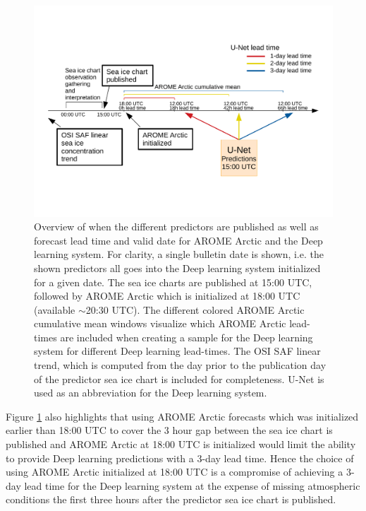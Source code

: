 \documentclass[../main/thesis]{subfiles}
\begin{document}
\begin{figure}
    \centering
    \includegraphics[width=\textwidth]{Predictor_schedule.pdf}
    \caption{\label{fig:pred_schedule}Overview of when the different predictors are published as well as forecast lead time and valid date for AROME Arctic and the Deep learning system. For clarity, a single bulletin date is shown, i.e. the shown predictors all goes into the Deep learning system initialized for a given date. The sea ice charts are published at 15:00 UTC, followed by AROME Arctic which is initialized at 18:00 UTC (available $\sim$20:30 UTC). The different colored AROME Arctic cumulative mean windows visualize which AROME Arctic lead-times are included when creating a sample for the Deep learning system for different Deep learning lead-times. The OSI SAF linear trend, which is computed from the day prior to the publication day of the predictor sea ice chart is included for completeness. U-Net is used as an abbreviation for the Deep learning system.}
\end{figure}

Figure \ref{fig:pred_schedule} also highlights that using AROME Arctic forecasts which was initialized earlier than 18:00 UTC to cover the 3 hour gap between the sea ice chart is published and AROME Arctic at 18:00 UTC is initialized would limit the ability to provide Deep learning predictions with a 3-day lead time. Hence the choice of using AROME Arctic initialized at 18:00 UTC is a compromise of achieving a 3-day lead time for the Deep learning system at the expense of missing atmospheric conditions the first three hours after the predictor sea ice chart is published.
\end{document}
